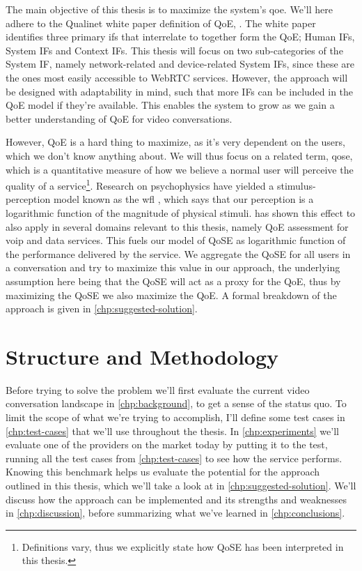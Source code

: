 The main objective of this thesis is to maximize the system's \gls{qoe}. We'll here adhere to the Qualinet white paper definition of QoE,  \cite{qualinet}. The white paper identifies three primary \glspl{if} that interrelate to together form the QoE; Human IFs, System IFs and Context IFs. This thesis will focus on two sub-categories of the System IF, namely network-related and device-related System IFs, since these are the ones most easily accessible to WebRTC services. However, the approach will be designed with adaptability in mind, such that more IFs can be included in the QoE model if they're available. This enables the system to grow as we gain a better understanding of QoE for video conversations.

However, QoE is a hard thing to maximize, as it's very dependent on the users, which we don't know anything about. We will thus focus on a related term, \gls{qose}, which is a quantitative measure of how we believe a normal user will perceive the quality of a service\footnote{Definitions vary, thus we explicitly state how QoSE has been interpreted in this thesis.}. Research on psychophysics have yielded a stimulus-perception model known as the \gls{wfl} \cite{wfl}, which says that our perception is a logarithmic function of the magnitude of physical stimuli. \cite{wfl-qoe} has shown this effect to also apply in several domains relevant to this thesis, namely QoE assessment for \gls{voip} and data services. This fuels our model of QoSE as logarithmic function of the performance delivered by the service. We aggregate the QoSE for all users in a conversation and try to maximize this value in our approach, the underlying assumption here being that the QoSE will act as a proxy for the QoE, thus by maximizing the QoSE we also maximize the QoE. A formal breakdown of the approach is given in \autoref{chp:suggested-solution}.


\section{Structure and Methodology}

Before trying to solve the problem we'll first evaluate the current video conversation landscape in \autoref{chp:background}, to get a sense of the status quo. To limit the scope of what we're trying to accomplish, I'll define some test cases in \autoref{chp:test-cases} that we'll use throughout the thesis. In \autoref{chp:experiments} we'll evaluate one of the providers on the market today by putting it to the test, running all the test cases from \autoref{chp:test-cases} to see how the service performs. Knowing this benchmark helps us evaluate the potential for the approach outlined in this thesis, which we'll take a look at in \autoref{chp:suggested-solution}. We'll discuss how the approach can be implemented and its strengths and weaknesses in \autoref{chp:discussion}, before summarizing what we've learned in \autoref{chp:conclusions}.


